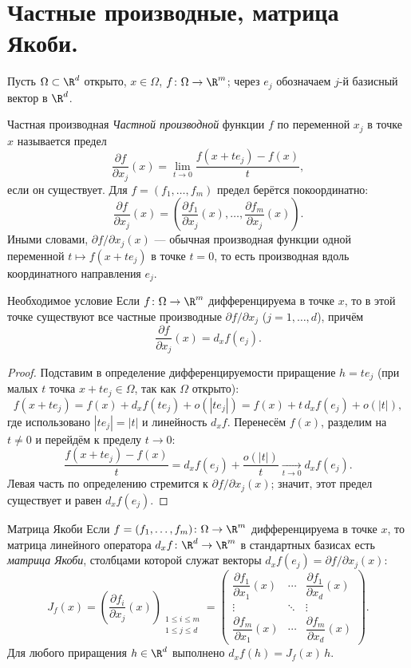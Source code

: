 
\section{Частные производные, матрица Якоби.}

Пусть $\Omega\subset\R^d$ открыто, $x\in\Omega$, $f\colon\Omega\to\R^m$; через $e_j$ обозначаем $j$-й базисный вектор в $\R^d$.

\begin{Definition}{Частная производная}{}
	\emph{Частной производной} функции $f$ по переменной $x_j$ в точке $x$ называется предел
	\[
	\frac{\partial f}{\partial x_j}(x)=\lim_{t\to0}\frac{f(x+te_j)-f(x)}{t},
	\]
	если он существует. Для $f=(f_1,\dots,f_m)$ предел берётся покоординатно:
	\[
	\frac{\partial f}{\partial x_j}(x)=\left(\frac{\partial f_1}{\partial x_j}(x),\dots,\frac{\partial f_m}{\partial x_j}(x)\right).
	\]
	Иными словами, $\partial f/\partial x_j(x)$ --- обычная производная функции одной переменной $t\mapsto f(x+te_j)$ в точке $t=0$, то есть производная вдоль координатного направления $e_j$.
\end{Definition}

\begin{Statement}[required]{Необходимое условие}{}
	Если $f\colon\Omega\to\R^m$ дифференцируема в точке $x$, то в этой точке существуют все частные производные $\partial f/\partial x_j$ ($j=1,\dots,d$), причём
	\[
	\frac{\partial f}{\partial x_j}(x)=d_xf(e_j).
	\]
\end{Statement}

\begin{proof}
	Подставим в определение дифференцируемости приращение $h=te_j$ (при малых $t$ точка $x+te_j\in\Omega$, так как $\Omega$ открыто):
	\[
	f(x+te_j)=f(x)+d_xf(te_j)+o(|te_j|)=f(x)+t\,d_xf(e_j)+o(|t|),
	\]
	где использовано $|te_j|=|t|$ и линейность $d_xf$. Перенесём $f(x)$, разделим на $t\ne0$ и перейдём к пределу $t\to0$:
	\[
	\frac{f(x+te_j)-f(x)}{t}=d_xf(e_j)+\frac{o(|t|)}{t}\xrightarrow[t\to0]{}d_xf(e_j).
	\]
	Левая часть по определению стремится к $\partial f/\partial x_j(x)$; значит, этот предел существует и равен $d_xf(e_j)$.
\end{proof}

\begin{Corollary}{Матрица Якоби}{}
	Если $f=(f_1,\dots,f_m)\colon\Omega\to\R^m$ дифференцируема в точке $x$, то матрица линейного оператора $d_xf\colon\R^d\to\R^m$ в стандартных базисах есть \emph{матрица Якоби}, столбцами которой служат векторы $d_xf(e_j)=\partial f/\partial x_j(x)$:
	\[
	J_f(x)=\left(\frac{\partial f_i}{\partial x_j}(x)\right)_{\substack{1\le i\le m\\ 1\le j\le d}}
	=\begin{pmatrix}
		\dfrac{\partial f_1}{\partial x_1}(x) & \cdots & \dfrac{\partial f_1}{\partial x_d}(x)\\[8pt]
		\vdots & \ddots & \vdots\\[4pt]
		\dfrac{\partial f_m}{\partial x_1}(x) & \cdots & \dfrac{\partial f_m}{\partial x_d}(x)
	\end{pmatrix}.
	\]
	Для любого приращения $h\in\R^d$ выполнено $d_xf(h)=J_f(x)\,h$.
\end{Corollary}


